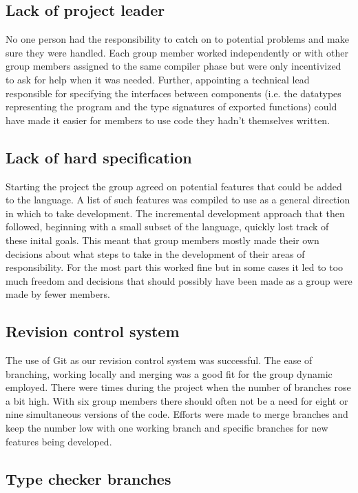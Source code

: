 \subsection{Lack of project leader}

No one person had the responsibility to catch on to potential problems and make sure they were handled. Each group member worked independently or with other group members assigned to the same compiler phase but were only incentivized to ask for help when it was needed. Further, appointing a technical lead responsible for specifying the interfaces between components (i.e. the datatypes representing the program and the type signatures of exported functions) could have made it easier for members to use code they hadn’t themselves written.

\subsection{Lack of hard specification}

Starting the project the group agreed on potential features that could be added to the language. A list of such features was compiled to use as a general direction in which to take development. The incremental development approach that then followed, beginning with a small subset of the language, quickly lost track of these inital goals. This meant that group members mostly made their own decisions about what steps to take in the development of their areas of responsibility. For the most part this worked fine but in some cases it led to too much freedom and decisions that should possibly have been made as a group were made by fewer members.

\subsection{Revision control system}

The use of Git as our revision control system was successful. The ease of branching, working locally and merging was a good fit for the group dynamic employed. 
There were times during the project when the number of branches rose a bit high. With six group members there should often not be a need for eight or nine simultaneous versions of the code. Efforts were made to merge branches and keep the number low with one working branch and specific branches for new features being developed.

\subsection{Type checker branches}

